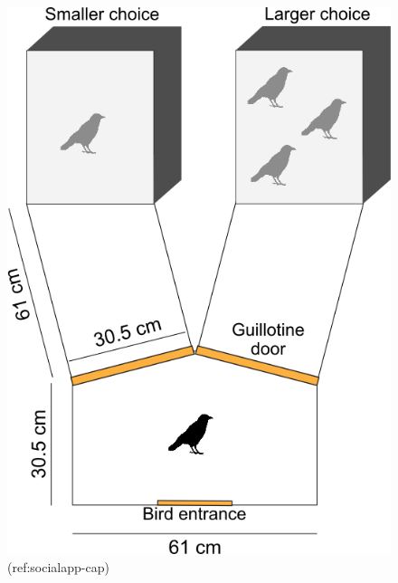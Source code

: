 \documentclass[
]{article}
\begin{document}
\begin{figure}

{\centering \includegraphics[width=1\linewidth]{../figures/social_apparatus} 

}

\caption{(ref:socialapp-cap)}\label{fig:socialapp}
\end{figure}
\end{document}
